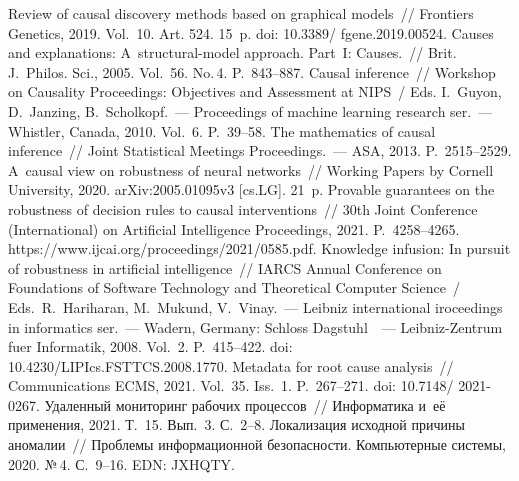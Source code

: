 \begin{multicols}{2}
\vspace*{-9pt}
  
{\small\frenchspacing
 {%
 \begin{thebibliography}{99}
 
 \vspace*{-2pt}
    
 Review of causal discovery methods based on graphical 
models~// Frontiers Genetics, 2019. Vol.~10. Art. 524. 15~p. doi: 10.3389/ fgene.2019.00524.
  Causes and explanations: A~structural-model approach. 
Part~I: Causes.~// Brit. J.~Philos. Sci., 2005. Vol.~56. No.\,4. P.~843--887. 
 Causal inference~// Workshop on Causality Proceedings: Objectives and Assessment at 
NIPS~/ Eds. I.~Guyon, D.~Janzing, B.~Scholkopf.~--- Proceedings of machine learning research 
ser.~--- Whistler, Canada, 2010. Vol.~6. P.~39--58. 
 The mathematics of causal inference~// Joint Statistical Meetings Proceedings.~--- ASA, 
2013. P.~2515--2529.
 A~causal view on robustness of neural networks~// Working Papers 
by Cornell University, 2020. arXiv:2005.01095v3 [cs.LG]. 21~p.
 Provable guarantees on the robustness of decision rules to 
causal interventions~// 30th Joint Conference (International) on Artificial Intelligence 
Proceedings, 2021. P.~4258--4265. {\sf 
https://www.ijcai.org/proceedings/2021/0585.pdf}.
 Knowledge infusion: In pursuit of robustness in artificial intelligence~// IARCS 
Annual Conference on Foundations of Software Technology and Theoretical Computer Science~/ 
Eds.\ R.~Hariharan, M.~Mukund, V.~Vinay.~---
Leibniz international iroceedings in informatics ser.~--- Wadern, Germany: Schloss 
Dagstuhl~~--- Leibniz-Zentrum fuer Informatik, 2008.  Vol.~2. P.~415--422. doi: 
10.4230/LIPIcs.FSTTCS.2008.1770.
 Metadata for root cause 
analysis~// Communications ECMS, 2021. Vol.~35. Iss.~1. P.~267--271. doi: 10.7148/ 2021-0267.
 Удаленный мониторинг 
рабочих процессов~// Информатика и~её применения, 2021. Т.~15. Вып.~3. С.~2--8.
 Локализация исходной причины аномалии~// 
Проблемы информационной безопас\-ности. Компьютерные сис\-те\-мы, 2020.
№\,4. С.~9--16. EDN: JXHQTY.
 


\end{thebibliography}}}
\end{multicols}
